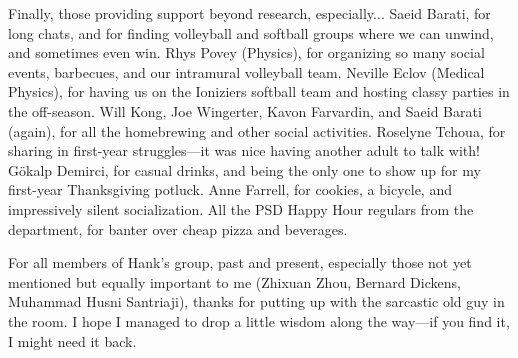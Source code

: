 Finally, those providing support beyond research, especially...
Saeid Barati, for long chats, and for finding volleyball and softball groups where we can unwind, and sometimes even win.
Rhys Povey (Physics), for organizing so many social events, barbecues, and our intramural volleyball team.
Neville Eclov (Medical Physics), for having us on the Ioniziers softball team and hosting classy parties in the off-season.
Will Kong, Joe Wingerter, Kavon Farvardin, and Saeid Barati (again), for all the homebrewing and other social activities.
Roselyne Tchoua, for sharing in first-year struggles---it was nice having another adult to talk with!
G{\"o}kalp Demirci, for casual drinks, and being the only one to show up for my first-year Thanksgiving potluck.
Anne Farrell, for cookies, a bicycle, and impressively silent socialization.
All the PSD Happy Hour regulars from the department, for banter over cheap pizza and beverages.

For all members of Hank's group, past and present, especially those not yet mentioned but equally important to me (Zhixuan Zhou, Bernard Dickens, Muhammad Husni Santriaji), thanks for putting up with the sarcastic old guy in the room.
I hope I managed to drop a little wisdom along the way---if you find it, I might need it back.
